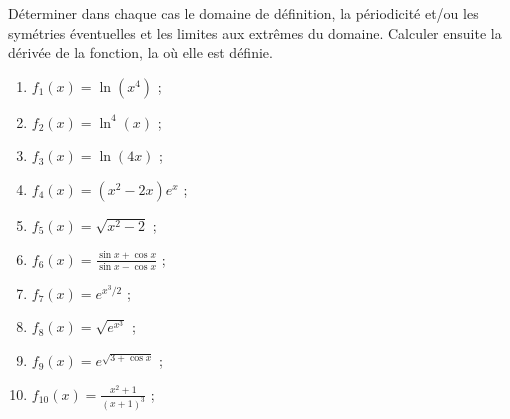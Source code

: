 
\begin{exercice}[\minsyndical]\label{exoTD2_2}

Déterminer dans chaque cas le domaine de définition, la périodicité et/ou les symétries éventuelles et les limites aux extrêmes du domaine. Calculer ensuite la dérivée de la fonction, la où elle est définie.
\begin{enumerate}
\item 
  $\displaystyle f_1(x)=\ln (x^4)$ ;
  \item 
    $\displaystyle f_2(x)=\ln^4 (x)$ ;
    \item
      $\displaystyle f_3(x)=\ln (4x)$ ;
      \item
        $\displaystyle f_4(x)=(x^2-2x)e^x$ ;
        \item 
          $\displaystyle f_5(x)=\sqrt{x^2-2}$ ;
          \item
            $\displaystyle f_6(x)=\frac{\sin x +\cos x}{\sin x -\cos x}$ ;
            \item
              $\displaystyle f_7(x)=e^{x^3/2}$ ;
              \item 
                $\displaystyle f_8(x)=\sqrt{e^{x^3}} $ ;
                \item 
                  $\displaystyle f_9(x)=e^{\sqrt{3+\cos x}}$ ;
                  \item
                    $\displaystyle f_{10}(x)=\frac{x^2+1}{(x+1)^3}$ ;
\end{enumerate}

  
\end{exercice}
